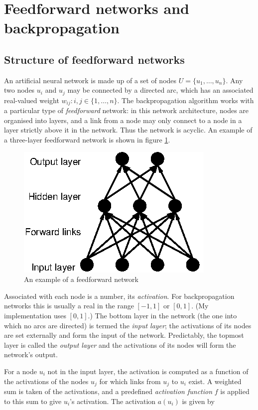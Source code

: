 \section{Feedforward networks and backpropagation}
\label{theory-ff-bp}

\subsection{Structure of feedforward networks}

An artificial neural network is made up of a set of nodes $U = \{u_1,
\ldots, u_n\}$. Any two nodes $u_i$ and $u_j$ may be connected by a
directed arc, which has an associated real-valued weight $w_{ij} : i,j
\in \{1, \ldots, n\}$. The backpropagation algorithm works with a
particular type of \emph{feedforward} network: in this network
architecture, nodes are organised into layers, and a link from a
node may only connect to a node in a layer strictly above it in the
network. Thus the network is acyclic. An example of a three-layer
feedforward network is shown in figure \ref{fig-ffn}.

\begin{figure}[htb]
  \label{fig-ffn}
  \centerline{\includegraphics{figs/ffn.eps}}
  \caption{An example of a feedforward network}
\end{figure}

Associated with each node is a number, its \emph{activation}. For
backpropagation networks this is usually a real in the range $[-1,1]$
or $[0,1]$. (My implementation uses $[0,1]$.) The bottom layer in the
network (the one into which no arcs are directed) is termed the
\emph{input layer}; the activations of its nodes are set externally
and form the input of the network. Predictably, the topmost layer is
called the \emph{output layer} and the activations of its nodes will
form the network's output.

For a node $u_i$ not in the input layer, the activation is computed as a
function of the activations of the nodes $u_j$ for which links from
$u_j$ to $u_i$ exist. A weighted sum is taken of the activations, and
a predefined \emph{activation function} $f$ is applied to this sum to give
$u_i$'s activation. The activation $a(u_i)$ is given by

